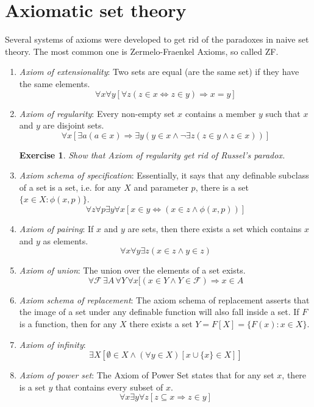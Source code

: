 \documentclass[11pt,a5paper]{article}
\newtheorem{exercise}{Exercise}
\begin{document}
\section{Axiomatic set theory}

Several systems of axioms were developed to get rid of the paradoxes in naive set theory. The most common one is Zermelo-Fraenkel Axioms, so called ZF.

\begin{enumerate}
	\item \emph{Axiom of extensionality}: 
Two sets are equal (are the same set) if they have the same elements.
\[\forall x \forall y [ \forall z (z \in x \Leftrightarrow z \in y) \Rightarrow x = y]\]

	\item \emph{Axiom of regularity}:
Every non-empty set $x$ contains a member $y$ such that $x$ and $y$ are disjoint sets.
\[\forall x [ \exists a ( a \in x) \Rightarrow \exists y ( y \in x \land \lnot \exists z (z \in y \land z \in x))]\]
\begin{exercise}
Show that Axiom of regularity get rid of Russel's paradox.
\end{exercise}

	\item \emph{Axiom schema of specification}:
Essentially, it says that any definable subclass of a set is a set, i.e. for any $X$ and parameter $p$, there is a set $\{x \in X : \phi(x,p)\}$.
\[\forall z \forall p \exists y \forall x [x \in y \Leftrightarrow ( x \in z \land \phi(x,p) )]\]

	\item \emph{Axiom of pairing}:
If $x$ and $y$ are sets, then there exists a set which contains $x$ and $y$ as elements.
\[\forall x \forall y \exists z (x \in z \land y \in z)\]
	
	\item \emph{Axiom of union}:
The union over the elements of a set exists.
\[\forall \mathcal{F} \,\exists A \, \forall Y\, \forall x [(x \in Y \land Y \in \mathcal{F}) \Rightarrow x \in A\]
	
	\item \emph{Axiom schema of replacement}:
The axiom schema of replacement asserts that the image of a set under any definable function will also fall inside a set.
If $F$ is a function, then for any $X$ there exists a set $Y=F[X]=\{F(x):x \in X\}$.
	
	\item \emph{Axiom of infinity}:
	\[\exists X \left [\emptyset \in X \land (\forall y \in X )[x \cup \{x\}  \in X]\right ]\]
	
	\item \emph{Axiom of power set}:
The Axiom of Power Set states that for any set $x$, there is a set $y$ that contains every subset of $x$.
\[\forall x \exists y \forall z [z \subseteq x \Rightarrow z \in y]\]
	
\end{enumerate}
\end{document}
